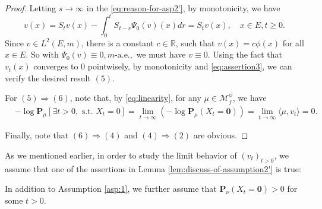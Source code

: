 \begin{proof}
	Letting $s\to\infty$ in the \eqref{eq:reason-for-asp2'}, by monotonicity, we have
\[
	v(x)
	=S_tv(x)-\int_0^t S_{t-r}\Psi_0(v)(x)dr=S_tv(x),
	\quad x\in E, t\geq 0.
\]
	Since $v\in L^2(E,m)$, there is a constant $c\in \mathbb R$, such that $v(x) = c\phi(x)$ for all $x\in E$.
	So with $\Psi_0 (v) \equiv 0, m\text{-a.e.},$ we must have $v\equiv 0$.
	Using the fact that $v_t(x)$ converges to $0$ pointwisely, by monotonicity and \eqref{eq:assertion3}, we can verify the desired result $(5)$.
\par
	For $(5)\Rightarrow (6)$, note that, by \eqref{eq:linearity}, for any $\mu\in\mathcal M_f^\phi$, we have
\[\begin{split}
	&-\log\mathbf P_\mu[\exists t>0,\text{ s.t. }X_t=0]
	=\lim_{t\to \infty}(-\log\mathbf P_\mu(X_t = \mathbf 0))
	=\lim_{t\to\infty}\langle\mu, v_t\rangle
	= 0.
\end{split}\]
\par
	Finally, note that $(6)\Rightarrow (4)$ and $(4)\Rightarrow (2)$ are obvious.
\end{proof}
	As we mentioned earlier, in order to study the limit behavior of $(v_t)_{t>0}$, we assume that one of the assertions in Lemma \ref{lem:discuss-of-assumption2'} is true:
\begin{asp}
\label{asp:1'}
	In addition to Assumption \ref{asp:1}, we further assume that $\mathbf P_\nu (X_t = \mathbf 0) > 0$ for some $t>0$.
\end{asp}

